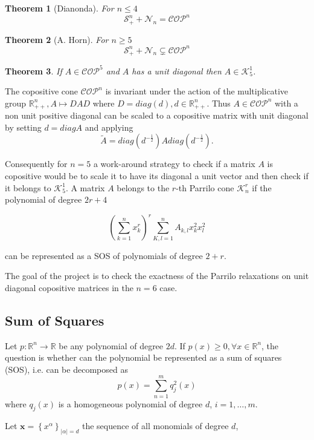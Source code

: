\documentclass[onecolumn,11pt,a4paper]{article}
\theoremstyle{plain}  %
\newtheorem{theorem}{Theorem}[section]
\theoremstyle{remark}  %
\begin{document}
\begin{theorem}[Dianonda]
	For $n \le 4$ 
	\[
		 \mathcal{S}_+^n + \mathcal{N}_n =  \mathcal{COP}^n
	\]
\end{theorem}

\begin{theorem}[A. Horn]
	For $n \ge 5$
	\[
		 \mathcal{S}_+^n + \mathcal{N}_n \subsetneq \mathcal{COP}^n
	\]
\end{theorem}

\begin{theorem}
	If $A \in \mathcal{COP}^5$ and $A$ has a unit diagonal then $A \in
	\mathcal{K}_5^1$.
\end{theorem}

The copositive cone $\mathcal{COP}^n$ is invariant under the action of the
multiplicative group $\mathbb{R}^n_{++}, A \mapsto D A D$ where $D = diag(d), d
\in \mathbb{R}^n_{++}$. Thus $A \in \mathcal{COP}^n$ with a non unit positive diagonal can be scaled to a copositive matrix with unit diagonal by setting
$d = diag A$ and applying 
\[
	\tilde{A} = diag\left( d^{-\frac{1}{2}} \right) A diag\left( d^{-\frac{1}{2}}
	\right).
\]

Consequently for $n = 5$ a work-around strategy to check if a matrix $A$ is copositive would
be to scale it to have its diagonal a unit vector and then check if it belongs
to $\mathcal{K}_5^1$. A matrix $A$ belongs to the $r$-th Parrilo cone $\mathcal{K}_n^r$ if the
polynomial of degree $2r + 4$ 

\[
	\left( \sum_{k = 1}^n x^r_k  \right)^r \sum_{K, l = 1}^n A_{k,l} x^2_k x^2_l 
\]

can be represented as a SOS of polynomials of degree $2 + r$.

The goal of the project is to check the exactness of the Parrilo relaxations on
unit diagonal copositive matrices in the $n = 6$ case.

\subsection{Sum of Squares}
\label{sos}
\label{sub:definition}
Let $p: \mathbb{R}^n \rightarrow   \mathbb{R} $ be  any polynomial of degree $2d$. If $p(x)
\geq 0 , \forall x \in \mathbb{R}^n $,  the question is whether can the
polynomial be represented as a sum of squares (SOS), i.e. can be decomposed as 
\[  p(x) =  \sum_{n=1}^m q^{2}_j(x)\] 
where $q_j(x)$ is a homogeneous polynomial of degree $d$, $i = 1,\ldots,m$. 

Let $\mathbf{x} = \left\{ x^\alpha \right\}_{ |\alpha| = d }$ the sequence of all
monomials of degree $d$,
\end{document}
